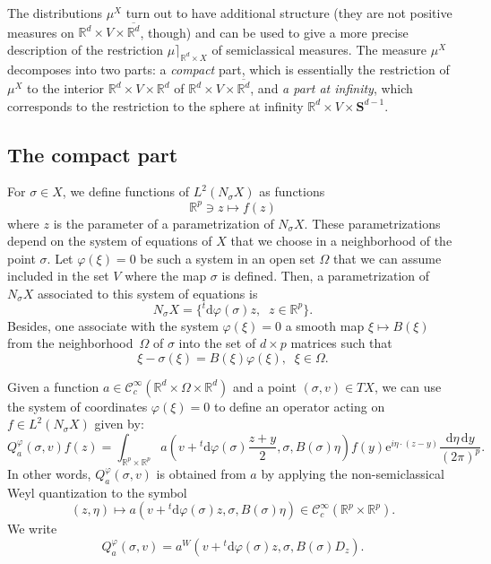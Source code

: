 \documentclass[10pt]{amsart}
\theoremstyle{definition}
\newcommand*\R{{\mathbb R}}
\numberwithin{equation}{section}
\newcommand{\ee}{{\mathrm e}}
\newcommand*{\dd}{\mathrm{d}}
\newcommand*{\dy}{\dd y}
\newcommand*{\deta}{\dd \eta}
\newcommand*{\dphi}{\dd \varphi}
\begin{document}
The distributions $ \mu^{X}$ turn out to have additional structure (they are not positive measures on $\R^d\times V\times \overline{\R^d}$, though) and can be used to give a more precise description of the restriction $\mu\rceil_{\R^d\times X}$ of semiclassical measures. The measure $\mu^{X}$ decomposes into two parts: a \emph{compact} part, which is essentially the restriction of $\mu^{X}$ to the interior $\R^d\times V\times \R^d$ of $\R^d\times V\times \overline{\R^d}$, and \emph{a part at infinity}, which corresponds to the restriction to the sphere at infinity $\R^d\times V\times\mathbf{S}^{d-1}$.



\subsection{The compact part}
For $\sigma\in X$, we define functions of $L^2(N_\sigma X)$ as functions
\[
\R^p\ni z\mapsto f(z)
\]
where $z$ is the parameter of a parametrization of $N_\sigma X$. These parametrizations depend on the system of equations of $X$ that we choose in a neighborhood of the point $\sigma$. Let $\varphi(\xi)=0$ be such a system in an open set $\Omega$ that we can assume included in the set $V$ where the map $\sigma$ is defined. Then, a parametrization of $N_\sigma X$ associated to this system of equations is
\[
N_\sigma X= \{ {}^t\dphi(\sigma) z,\;\; z\in\R^p\}.
\]
Besides, one associate with the system $\varphi(\xi)=0$ a smooth map $\xi\mapsto B(\xi)$ from the neighborhood~$\Omega$ of $\sigma$ into the set of $d\times p$ matrices such that
\begin{equation}\label{def:B}
\xi-\sigma(\xi)=B(\xi)\varphi(\xi),\;\;\xi\in\Omega.
\end{equation}


Given a function $a\in {\mathcal C}^\infty_c(\R^d\times \Omega\times \R^d)$ and a point $(\sigma,v)\in TX$, we can use the system of coordinates $\varphi(\xi)=0$ to define an operator acting on $f\in L^2(N_\sigma X)$ given by:
\[
Q_a^\varphi (\sigma,v)f(z)=\int_{\R^p\times \R^p}a\left(v+ {}^t\dphi(\sigma) \frac{z+y}{2},\sigma, B(\sigma) \eta\right)f(y){\ee}^{i\eta\cdot (z-y)}\frac{\deta\,\dy}{(2\pi)^p}.
\]
In other words, $Q_a^\varphi(\sigma,v)$ is obtained from $a$ by applying the non-semiclassical Weyl quantization to the symbol
\[
(z,\eta)\mapsto a\left(v+ {}^t\dphi(\sigma) z,\sigma, B(\sigma) \eta\right)\in {\mathcal C}^\infty_c(\R^p\times\R^p).
\]
We write
\[
Q_a^\varphi (\sigma,v)= a^W\left(v+ {}^t\dphi(\sigma) z,\sigma, B(\sigma) D_z\right).
\]
\end{document}
